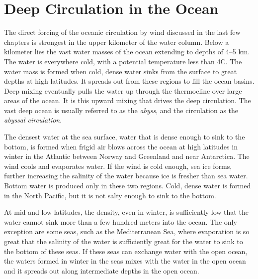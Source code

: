 \chapter{Deep Circulation in the Ocean} 
The direct forcing of the oceanic circulation by wind discussed in the
last few chapters is strongest in the upper kilometer of the water
column. Below a kilometer lies the vast water masses of the ocean
extending to depths of 4--5 km.  The water is everywhere cold, with a
potential temperature less than 4\degrees C.  The water mass is formed
when cold, dense water sinks from the surface to great depths at high
latitudes. It spreads out from these regions to fill the ocean
basins. Deep mixing eventually pulls the
water up through the thermocline over large areas of the ocean. It
is this upward mixing that drives the
deep circulation.  The vast deep ocean is usually referred to as the
\textit{abyss}, and the circulation as the
\textit{abyssal circulation}.

The densest water at the sea surface, water that is dense enough to
sink to the bottom, is formed when frigid air blows across the ocean
at high latitudes in winter in the Atlantic between Norway and
Greenland and near Antarctica. The wind cools and evaporates water. If
the wind is cold enough, sea ice forms, further increasing the
salinity of the water because ice is fresher than sea water.  Bottom
water is produced only in these two
regions. Cold, dense water is formed in the North Pacific, but it is
not salty enough to sink to the bottom.

At mid and low latitudes, the density, even in winter, is sufficiently
low that the water cannot sink more than a few hundred meters into the
ocean. The only exception are some seas, such as the Mediterranean
Sea, where evaporation is so great that the salinity of the water is
sufficiently great for the water to sink to the bottom of these
seas. If these seas can exchange water with the open ocean, the waters
formed in winter in the seas mixes with the water in the open ocean
and it spreads out along intermediate depths in the open ocean.


